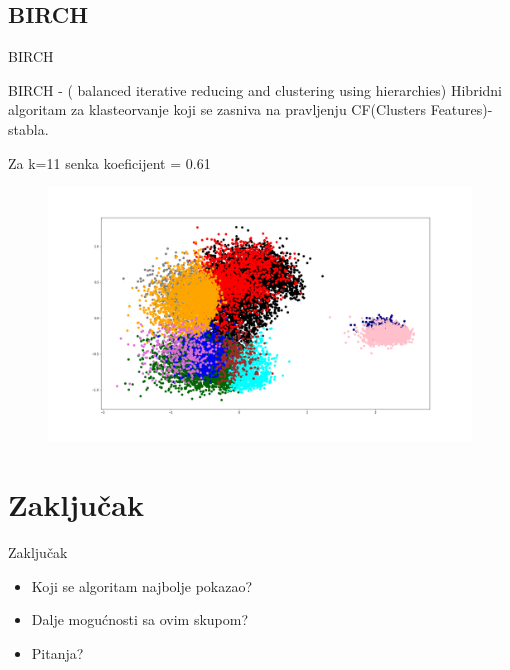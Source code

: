 \documentclass[12pt]{beamer}
\begin{document}
\subsection{BIRCH}
\begin{frame}[t]{BIRCH}
\footnotesize
\begin{definition} 
BIRCH - ( balanced iterative reducing and clustering using hierarchies)
Hibridni algoritam za klasteorvanje koji se zasniva na pravljenju CF(Clusters
Features)-stabla.
\end{definition}
Za k=11 senka koeficijent = 0.61
\begin{figure}
\includegraphics[scale=0.1]{../birch_11_pca}
\end{figure}
\end{frame}

\section{Zaključak}
\begin{frame}{Zaključak}
\begin{itemize}
\item Koji se algoritam najbolje pokazao? \pause
\item Dalje mogućnosti sa ovim skupom? \pause
\item Pitanja?
\end{itemize}

\end{frame}
\end{document}
